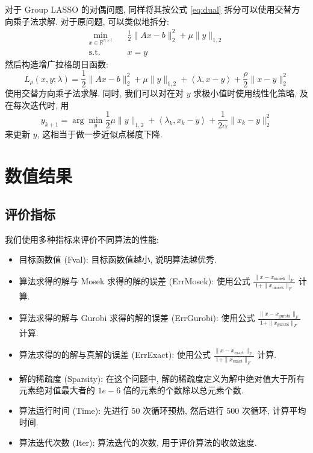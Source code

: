 \documentclass{article}
\begin{document}
对于 Group LASSO 的对偶问题, 同样将其按公式 \ref{eq:dual} 拆分可以使用交替方向乘子法求解. 对于原问题, 可以类似地拆分:
\begin{equation*}
    \begin{aligned}
        \min_{x \in \mathbb{R}^{n\times l}}\quad &\frac{1}{2} \|Ax - b\|_2^2 +
        \mu \|y\|_{1,2}\\
        \text{s.t.}\quad & x=y
    \end{aligned}
\end{equation*}
然后构造增广拉格朗日函数:
\begin{equation*}
    L_\rho(x, y; \lambda) = \frac{1}{2} \|Ax - b\|_2^2 + \mu \|y\|_{1,2} + \left<\lambda, x - y\right> + \frac{\rho}{2}\|x - y\|_2^2
\end{equation*}
使用交替方向乘子法求解. 同时, 我们可以对在对 $y$ 求极小值时使用线性化策略, 及在每次迭代时, 用
\begin{equation*}
    y_{k+1} = \arg\min_y \frac{1}{2} \mu \|y\|_{1,2} + \left<\lambda_k, x_k - y\right> + \frac{1}{2\alpha}\|x_k - y\|_2^2
\end{equation*}
来更新 $y$, 这相当于做一步近似点梯度下降.

\section{数值结果}

\subsection{评价指标}
我们使用多种指标来评价不同算法的性能:
\begin{itemize}
    \item 目标函数值 (Fval): 目标函数值越小, 说明算法越优秀.
    \item 算法求得的解与 Mosek 求得的解的误差 (ErrMosek): 使用公式 $\frac{\|x - x_{\text{mosek}}\|_F}{1+\|x_{\text{mosek}}\|_F}$ 计算.
    \item 算法求得的解与 Gurobi 求得的解的误差 (ErrGurobi): 使用公式 $\frac{\|x - x_{\text{gurobi}}\|_F}{1+\|x_{\text{gurobi}}\|_F}$ 计算.
    \item 算法求得的的解与真解的误差 (ErrExact): 使用公式 $\frac{\|x - x_{\text{exact}}\|_F}{1+\|x_{\text{exact}}\|_F}$ 计算.
    \item 解的稀疏度 (Sparsity): 在这个问题中, 解的稀疏度定义为解中绝对值大于所有元素绝对值最大者的 $1e-6$ 倍的元素的个数除以总元素个数.
    \item 算法运行时间 (Time): 先进行 50 次循环预热, 然后进行 500 次循环, 计算平均时间.
    \item 算法迭代次数 (Iter): 算法迭代的次数, 用于评价算法的收敛速度.
\end{itemize}
\end{document}
